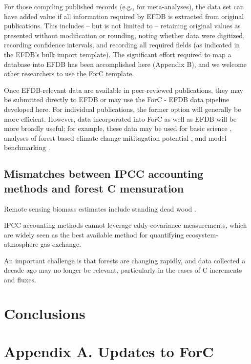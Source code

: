 \documentclass[, manuscript]{copernicus}
\begin{document}
For those compiling published records (e.g., for meta-analyses), the
data set can have added value if all information required by EFDB is
extracted from original publications. This includes -- but is not
limited to -- retaining original values as presented without
modification or rounding, noting whether data were digitized, recording
confidence intervals, and recording all required fields (as indicated in
the EFDB's bulk import template). The significant effort required to map
a database into EFDB has been accomplished here (Appendix B), and we
welcome other researchers to use the ForC template.

Once EFDB-relevant data are available in peer-reviewed publications,
they may be submitted directly to EFDB or may use the ForC - EFDB data
pipeline developed here. For individual publications, the former option
will generally be more efficient. However, data incorporated into ForC
as well as EFDB will be more broadly useful; for example, these data may
be used for basic science
\citep[e.g.,][]{banburymorgan_global_2021, anderson-teixeira_carbon_2021},
analyses of forest-based climate change mititagation potential
\citep[e.g.,][]{cook-patton_mapping_2020, goldstein_protecting_2020},
and model benchmarking \citep{fer_ecosystem_2021}.

\subsection{Mismatches between IPCC accounting methods and forest C
mensuration}

Remote sensing biomass estimates include standing dead wood
\citep{duncanson_aboveground_2021}.

IPCC accounting methods cannot leverage eddy-covariance measurements,
which are widely seen as the best available method for quantifying
ecosystem-atmosphere gas exchange.

An important challenge is that forests are changing rapidly, and data
collected a decade ago may no longer be relevant, particularly in the
cases of C increments and fluxes.

\section{Conclusions}

\clearpage

\section*{Appendix A. Updates to ForC}
\end{document}
